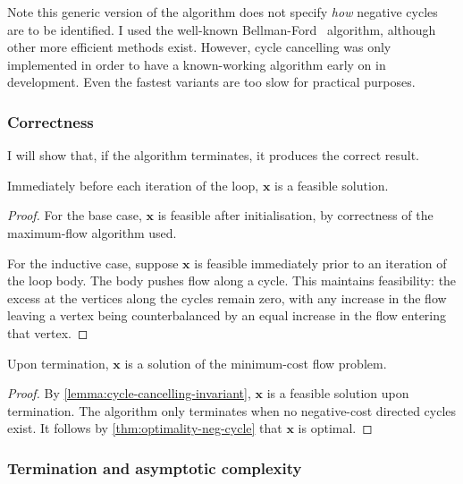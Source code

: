 Note this generic version of the algorithm does not specify \emph{how} negative cycles are to be identified. I used the well-known Bellman-Ford~\cite[p.~651]{CLRS:2009} algorithm, although other more efficient methods exist. However, cycle cancelling was only implemented in order to have a known-working algorithm early on in development. Even the fastest variants are too slow for practical purposes.

\subsubsection{Correctness} \label{appendix:impl-cc-analysis:correctness}

I will show that, if the algorithm terminates, it produces the correct result. \\

\begin{lemma} \label{lemma:cycle-cancelling-invariant}
    Immediately before each iteration of the loop, $\mathbf{x}$ is a feasible solution.
\end{lemma} 
\begin{proof}
    For the base case, $\mathbf{x}$ is feasible after initialisation, by correctness of the maximum-flow algorithm used.
    
    For the inductive case, suppose $\mathbf{x}$ is feasible immediately prior to an iteration of the loop body. The body pushes flow along a cycle. This maintains feasibility: the excess at the vertices along the cycles remain zero, with any increase in the flow leaving a vertex being counterbalanced by an equal increase in the flow entering that vertex.
\end{proof}

\begin{thm}
    \label{thm:cycle-cancelling-correctness}
    Upon termination, $\mathbf{x}$ is a solution of the minimum-cost flow problem.
\end{thm}
\begin{proof}
    By \cref{lemma:cycle-cancelling-invariant}, $\mathbf{x}$ is a feasible solution upon termination. The algorithm only terminates when no negative-cost directed cycles exist. It follows by \cref{thm:optimality-neg-cycle} that $\mathbf{x}$ is optimal.
\end{proof}

\subsubsection{Termination and asymptotic complexity} \label{appendix:impl-cc-analysis:complexity}

